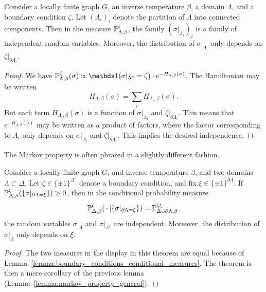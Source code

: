 \begin{lemma}
    \label{lemma:markov_property_general}
    Consider a locally finite graph $G$,
    an inverse temperature $\beta$,
    a domain $\Lambda$,
    and a boundary condition $\zeta$.
    Let $(\Lambda_i)_i$ denote the partition of $\Lambda$
    into connected components.
    Then in the measure
    $\P_{\Lambda,\beta}^\zeta$,
    the family $(\sigma|_{\Lambda_i})_i$
    is a family of independent random variables.
    Moreover, the distribution of $\sigma|_{\Lambda_i}$ only depends on
    $\zeta|_{\partial\Lambda_i}$.
\end{lemma}

\begin{proof}
    We have
    $\P_{\Lambda,\beta}^\zeta(\sigma)\propto \true{\sigma|_{\Lambda^c}=\zeta}\cdot e^{-H_{\Lambda,\beta}(\sigma)}$.
    The Hamiltonian may be written
    \[
        H_{\Lambda,\beta}(\sigma)
        =
        \sum_i H_{\Lambda_i,\beta}(\sigma).
    \]
    But each term $H_{\Lambda_i,\beta}(\sigma)$
    is a function of $\sigma|_{\Lambda_i}$ and $\zeta|_{\partial\Lambda_i}$.
    This means that $e^{-H_{\Lambda,\beta}(\sigma)}$ 
    may be written as a product of factors, where the factor corresponding
    to $\Lambda_i$ only depends on $\sigma|_{\Lambda_i}$ and $\zeta|_{\partial\Lambda_i}$.
    This implies the desired independence.
\end{proof}

The Markov property is often phrased in a slightly different fashion.

\begin{theorem}
    Consider a locally finite graph $G$,
    and inverse temperature $\beta$,
    and two domains $\Lambda\subset\Delta$.
    Let $\zeta\in\{\pm1\}^{\Delta^c}$ denote a boundary condition,
    and fix $\xi\in\{\pm1\}^{\partial\Lambda}$.
    If $\P_{\Delta,\beta}^\zeta(\{\sigma|_{\partial\Lambda=\xi}\})>0$,
    then in the conditional probability measure
    \[
        \P_{\Delta,\beta}^\zeta(\blank|\{\sigma|_{\partial\Lambda=\xi}\})
        =
        \P_{\Delta\cup\partial\Lambda,\beta}^{\zeta\xi}
        ,
    \]
    the random variables $\sigma|_{\Lambda}$
    and $\sigma|_{\Lambda^c}$ are independent.
    Moreover, the distribution of $\sigma|_{\Lambda}$ only depends on $\xi$.
\end{theorem}

\begin{proof}
The two measures in the display in this theorem are equal because of Lemma~\ref{lemma:boundary_conditions_conditional_measures}.
The theorem is then a mere corollary of the previous lemma (Lemma~\ref{lemma:markov_property_general}).
\end{proof}


